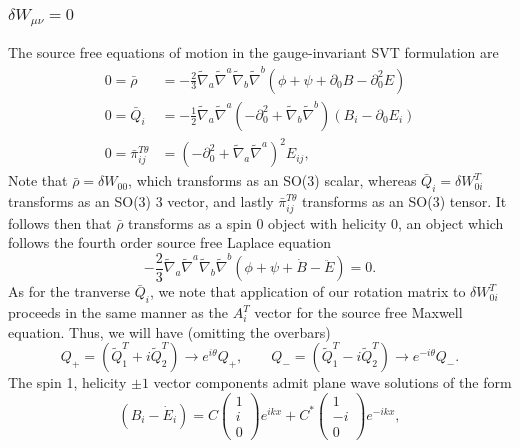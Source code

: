 \documentclass[10pt,letterpaper]{article}
\numberwithin{equation}{subsection}
\begin{document}
\subsubsection{$\delta W_{\mu\nu} = 0$}
The source free equations of motion in the gauge-invariant SVT formulation are
\begin{align}
0=\bar \rho &= -\frac{2}{3} \tilde{\nabla}_a\tilde{\nabla}^a\tilde{\nabla}_b\tilde{\nabla}^b (\phi + \psi +\partial_0{B}-\partial_0^2{E}) 
\nonumber\\
0=\bar Q_i &= -\frac{1}{2} \tilde{\nabla}_a\tilde{\nabla}^a\left(-\partial_0^2+\tilde{\nabla}_b\tilde{\nabla}^b\right)(B_i - \partial_0{E}_i)
\nonumber \\
0=\bar \pi_{ij}^{T\theta} &= \left(-\partial_0^2 + \tilde\nabla_a\tilde\nabla^a\right)^2 E_{ij},
\end{align}
Note that $\bar \rho = \delta W_{00}$, which transforms as an SO(3) scalar, whereas $\bar Q_i  = \delta W_{0i}^T$ transforms as an SO(3) 3 vector, and lastly $\bar \pi_{ij}^{T\theta}$ transforms as an SO(3) tensor. It follows then that $\bar \rho$ transforms as a spin 0 object with helicity 0, an object which follows the fourth order source free Laplace equation
\begin{equation}
\boxed{
 -\frac{2}{3} \tilde{\nabla}_a\tilde{\nabla}^a\tilde{\nabla}_b\tilde{\nabla}^b (\phi + \psi +\dot{B}-\ddot{E}) =0}.
\end{equation}
As for the tranverse $\bar Q_i$, we note that application of our rotation matrix to $\delta W_{0i}^T$ proceeds in the same manner as the $A_i^T$ vector for the source free Maxwell equation. Thus, we will have (omitting the overbars)
\begin{equation}
 Q_+ = \left(\tilde Q_1^T + i\tilde Q_2^T\right) \to e^{i\theta}  Q_+,\qquad  Q_- = \left(\tilde Q_1^T - i\tilde Q_2^T\right)\to e^{-i\theta}  Q_-.
\end{equation}
The spin 1, helicity $\pm 1$ vector components admit plane wave solutions of the form
\begin{equation}
\boxed{\left(B_i - \dot E_i\right) = C\begin{pmatrix}1\\i\\0\end{pmatrix} e^{ikx} + C^*\begin{pmatrix}1\\-i\\0\end{pmatrix} e^{-ikx}},
\end{equation} 
\end{document}
